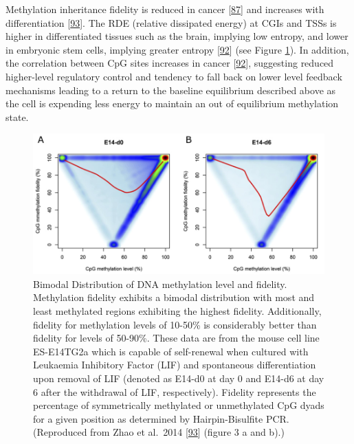 \documentclass[
]{book}
\begin{document}
Methylation inheritance fidelity is reduced in cancer {[}\protect\hyperlink{ref-Ushijima2005}{87}{]} and increases with differentiation {[}\protect\hyperlink{ref-Zhao2014}{93}{]}.
The RDE (relative dissipated energy) at CGIs and TSSs is higher in differentiated tissues such as the brain, implying low entropy, and lower in embryonic stem cells, implying greater entropy {[}\protect\hyperlink{ref-Jenkinson2017}{92}{]} (see Figure \ref{fig:Zhao2014fig3ab}).
In addition, the correlation between CpG sites increases in cancer {[}\protect\hyperlink{ref-Jenkinson2017}{92}{]}, suggesting reduced higher-level regulatory control and tendency to fall back on lower level feedback mechanisms leading to a return to the baseline equilibrium described above as the cell is expending less energy to maintain an out of equilibrium methylation state.

\begin{figure}

{\centering \includegraphics[width=0.8\linewidth]{figs/Zhao2014-fig3-ab} 

}

\caption{Bimodal Distribution of DNA methylation level and fidelity. Methylation fidelity exhibits a bimodal distribution with most and least methylated regions exhibiting the highest fidelity. Additionally, fidelity for methylation levels of 10-50\% is considerably better than fidelity for levels of 50-90\%. These data are from the mouse cell line ES-E14TG2a which is capable of self-renewal when cultured with Leukaemia Inhibitory Factor (LIF) and spontaneous differentiation upon removal of LIF (denoted as E14-d0 at day 0 and E14-d6 at day 6 after the withdrawal of LIF, respectively). Fidelity represents the percentage of symmetrically methylated or unmethylated CpG dyads for a given position as determined by Hairpin-Bisulfite PCR. (Reproduced from Zhao et al.~2014 {[}\protect\hyperlink{ref-Zhao2014}{93}{]} (figure 3 a and b).)}\label{fig:Zhao2014fig3ab}
\end{figure}
\end{document}
